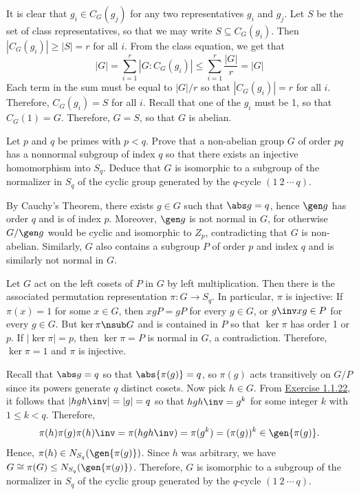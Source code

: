 \begin{sol}
	It is clear that $g_i \in C_G(g_j)$ for any two representatives $g_i$ and $g_j$. Let $S$ be the set of class representatives, so that we may write $S \subseteq C_G(g_i)$. Then $|C_G(g_i)| \geq |S| = r$ for all $i$. From the class equation, we get that
	\[|G| = \sum_{i = 1}^r |G : C_G(g_i)| \leq \sum_{i = 1}^r \frac{|G|}{r} = |G|\]
	Each term in the sum must be equal to $|G|/r$ so that $|C_G(g_i)| = r$ for all $i$. Therefore, $C_G(g_i) = S$ for all $i$. Recall that one of the $g_i$ must be 1, so that $C_G(1) = G$. Therefore, $G = S$, so that $G$ is abelian.
\end{sol}

\begin{exercise}
	Let $p$ and $q$ be primes with $p < q$. Prove that a non-abelian group $G$ of order $pq$ has a nonnormal subgroup of index $q$ so that there exists an injective homomorphism into $S_q$. Deduce that $G$ is isomorphic to a subgroup of the normalizer in $S_q$ of the cyclic group generated by the $q$-cycle $(1\ 2\ \cdots\ q)$.
\end{exercise}

\begin{sol}
	By Cauchy's Theorem, there exists $g \in G$ such that $\abs g = q$, hence $\gen g$ has order $q$ and is of index $p$. Moreover, $\gen g$ is not normal in $G$, for otherwise $G/\gen g$ would be cyclic and isomorphic to $Z_p$, contradicting that $G$ is non-abelian. Similarly, $G$ also contains a subgroup $P$ of order $p$ and index $q$ and is similarly not normal in $G$.

	Let $G$ act on the left cosets of $P$ in $G$ by left multiplication. Then there is the associated permutation representation $\pi : G \to S_q$. In particular, $\pi$ is injective: If $\pi(x) = 1$ for some $x \in G$, then $xgP = gP$ for every $g \in G$, or $g\inv xg \in P$ for every $g \in G$. But $\ker\pi \nsub G$ and is contained in $P$ so that $\ker\pi$ has order 1 or $p$. If $|\ker\pi| = p$, then $\ker\pi = P$ is normal in $G$, a contradiction. Therefore, $\ker\pi = 1$ and $\pi$ is injective.

	Recall that $\abs g = q$ so that $\abs{\pi(g)} = q$, so $\pi(g)$ acts transitively on $G/P$ since its powers generate $q$ distinct cosets. Now pick $h \in G$. From \hyperref[ex1.1.22]{Exercise 1.1.22}, it follows that $|hgh\inv| = |g| = q$ so that $hgh\inv = g^k$ for some integer $k$ with $1 \leq k < q$. Therefore,
	\[\pi(h)\pi(g)\pi(h)\inv = \pi(hgh\inv) = \pi(g^k) = (\pi(g))^k \in \gen{\pi(g)}.\]
	Hence, $\pi(h) \in N_{S_q}(\gen{\pi(g)})$. Since $h$ was arbitrary, we have $G \cong \pi(G) \leq N_{S_q}(\gen{\pi(g)})$. Therefore, $G$ is isomorphic to a subgroup of the normalizer in $S_q$ of the cyclic group generated by the $q$-cycle $(1\ 2\ \cdots\ q)$.
\end{sol}


